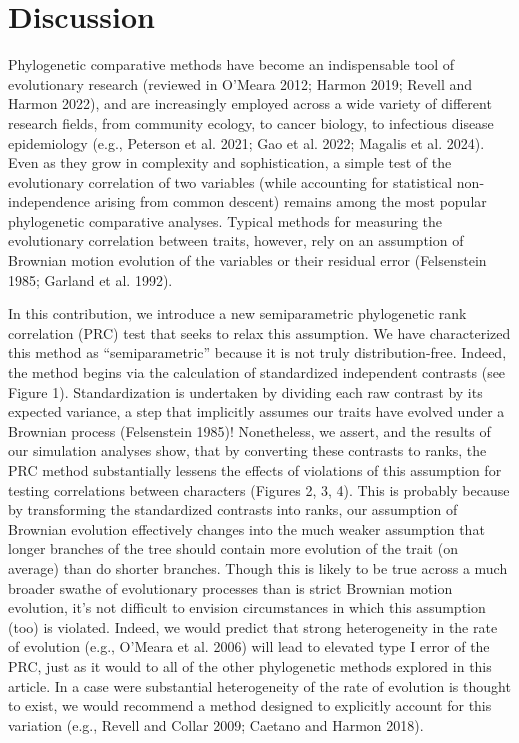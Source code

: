 \documentclass[fleqn,10pt,lineno]{wlpeerj} %
\begin{document}
\section{Discussion}\label{discussion}

Phylogenetic comparative methods have become an indispensable tool of evolutionary research (reviewed in O'Meara 2012; Harmon 2019; Revell and Harmon 2022), and are increasingly employed across a wide variety of different research fields, from community ecology, to cancer biology, to infectious disease epidemiology (e.g., Peterson et al. 2021; Gao et al. 2022; Magalis et al. 2024). Even as they grow in complexity and sophistication, a simple test of the evolutionary correlation of two variables (while accounting for statistical non-independence arising from common descent) remains among the most popular phylogenetic comparative analyses. Typical methods for measuring the evolutionary correlation between traits, however, rely on an assumption of Brownian motion evolution of the variables or their residual error (Felsenstein 1985; Garland et al. 1992).

In this contribution, we introduce a new semiparametric phylogenetic rank correlation (PRC) test that seeks to relax this assumption. We have characterized this method as ``semiparametric'' because it is not truly distribution-free. Indeed, the method begins via the calculation of standardized independent contrasts (see Figure 1). Standardization is undertaken by dividing each raw contrast by its expected variance, a step that implicitly assumes our traits have evolved under a Brownian process (Felsenstein 1985)! Nonetheless, we assert, and the results of our simulation analyses show, that by converting these contrasts to ranks, the PRC method substantially lessens the effects of violations of this assumption for testing correlations between characters (Figures 2, 3, 4). This is probably because by transforming the standardized contrasts into ranks, our assumption of Brownian evolution effectively changes into the much weaker assumption that longer branches of the tree should contain more evolution of the trait (on average) than do shorter branches. Though this is likely to be true across a much broader swathe of evolutionary processes than is strict Brownian motion evolution, it's not difficult to envision circumstances in which this assumption (too) is violated. Indeed, we would predict that strong heterogeneity in the rate of evolution (e.g., O'Meara et al. 2006) will lead to elevated type I error of the PRC, just as it would to all of the other phylogenetic methods explored in this article. In a case were substantial heterogeneity of the rate of evolution is thought to exist, we would recommend a method designed to explicitly account for this variation (e.g., Revell and Collar 2009; Caetano and Harmon 2018).
\end{document}
